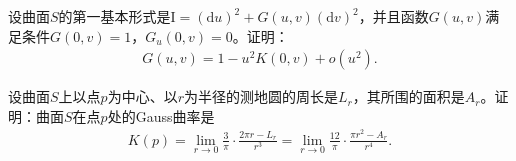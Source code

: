\documentclass[../../main.tex]{subfiles}%
\begin{document}
\begin{example}
设曲面$S$的第一基本形式是$\mathrm{I}=(\mathrm{d}u)^2+G(u,v)(\mathrm{d}v)^2$，并且函数$G(u,v)$满足条件$G(0,v)=1$，$G_u(0,v)=0$。证明：
\begin{align*}
G(u,v)=1-u^2K(0,v)+o(u^2).
\end{align*}
\end{example}

\begin{example}
设曲面$S$上以点$p$为中心、以$r$为半径的测地圆的周长是$L_r$，其所围的面积是$A_r$。证明：曲面$S$在点$p$处的Gauss曲率是
\begin{align*}
K(p)=\lim\limits_{r\to0}\frac{3}{\pi}\cdot\frac{2\pi r-L_r}{r^3}=\lim\limits_{r\to0}\frac{12}{\pi}\cdot\frac{\pi r^2-A_r}{r^4}.
\end{align*}
\end{example}
\end{document}

